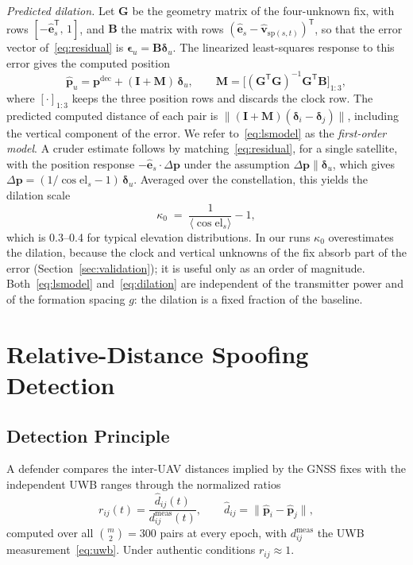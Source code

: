 \documentclass[conference]{IEEEtran}
\newcommand{\pest}[1]{\hat{\mathbf{p}}_{#1}}
\begin{document}
\emph{Predicted dilation.} Let $\mathbf{G}$ be the geometry matrix of
the four-unknown fix, with rows $[-\hat{\mathbf{e}}_s^{\mathsf T},\,1]$,
and $\mathbf{B}$ the matrix with rows
$(\hat{\mathbf{e}}_s-\hat{\mathbf{v}}_{\mathrm{sp}(s,t)})^{\mathsf T}$,
so that the error vector of~\eqref{eq:residual} is
$\boldsymbol{\epsilon}_u=\mathbf{B}\boldsymbol{\delta}_u$. The
linearized least-squares response to this error gives the computed
position
\begin{equation}
\pest{u}=\mathbf{p}^{\mathrm{dec}}+(\mathbf{I}+\mathbf{M})\,\boldsymbol{\delta}_u,
\qquad
\mathbf{M}=\bigl[(\mathbf{G}^{\mathsf T}\mathbf{G})^{-1}\mathbf{G}^{\mathsf T}\mathbf{B}\bigr]_{1:3},
\label{eq:lsmodel}
\end{equation}
where $[\cdot]_{1:3}$ keeps the three position rows and discards the
clock row. The predicted computed distance of each pair is
$\lVert(\mathbf{I}+\mathbf{M})(\boldsymbol{\delta}_i-\boldsymbol{\delta}_j)\rVert$,
including the vertical component of the error. We refer
to~\eqref{eq:lsmodel} as the \emph{first-order model}.
A cruder estimate follows by matching~\eqref{eq:residual}, for a single
satellite, with the position response
$-\hat{\mathbf{e}}_s\!\cdot\!\Delta\mathbf{p}$ under the assumption
$\Delta\mathbf{p}\parallel\boldsymbol{\delta}_u$, which gives
$\Delta\mathbf{p}=(1/\cos\mathrm{el}_s-1)\,\boldsymbol{\delta}_u$.
Averaged over the constellation, this yields the dilation scale
\begin{equation}
\kappa_0\;=\;\frac{1}{\langle\cos\mathrm{el}_s\rangle}-1 ,
\label{eq:dilation}
\end{equation}
which is 0.3--0.4 for typical elevation distributions. In our runs
$\kappa_0$ overestimates the dilation, because the clock and vertical
unknowns of the fix absorb part of the error
(Section~\ref{sec:validation}); it is useful only as an order of
magnitude. Both~\eqref{eq:lsmodel} and~\eqref{eq:dilation} are
independent of the transmitter power and of the formation spacing $g$:
the dilation is a fixed fraction of the baseline.

\section{Relative-Distance Spoofing Detection}
\label{sec:detection}

\subsection{Detection Principle}
\label{sec:principle}
A defender compares the inter-UAV distances implied by the GNSS fixes
with the independent UWB ranges through the normalized ratios
\begin{equation}
r_{ij}(t)=\frac{\hat{d}_{ij}(t)}{d^{\mathrm{meas}}_{ij}(t)},
\qquad
\hat{d}_{ij}=\lVert\pest{i}-\pest{j}\rVert ,
\label{eq:ratio}
\end{equation}
computed over all $\binom{m}{2}=300$ pairs at every epoch, with
$d^{\mathrm{meas}}_{ij}$ the UWB measurement~\eqref{eq:uwb}. Under
authentic conditions $r_{ij}\approx1$.
\end{document}
